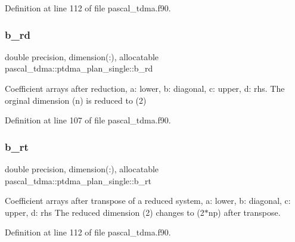 Definition at line 112 of file pascal\+\_\+tdma.\+f90.

\mbox{\label{structpascal__tdma_1_1ptdma__plan__single_acf24e954fa50a47ece2c59598b81c157}} 
\subsubsection{\texorpdfstring{b\_rd}{b\_rd}}
{\footnotesize\ttfamily double precision, dimension(\+:), allocatable pascal\+\_\+tdma\+::ptdma\+\_\+plan\+\_\+single\+::b\+\_\+rd}



Coefficient arrays after reduction, a\+: lower, b\+: diagonal, c\+: upper, d\+: rhs. The orginal dimension (n) is reduced to (2) 



Definition at line 107 of file pascal\+\_\+tdma.\+f90.

\mbox{\label{structpascal__tdma_1_1ptdma__plan__single_a8e9487525ccef0d45c8a5440103613b0}} 
\subsubsection{\texorpdfstring{b\_rt}{b\_rt}}
{\footnotesize\ttfamily double precision, dimension(\+:), allocatable pascal\+\_\+tdma\+::ptdma\+\_\+plan\+\_\+single\+::b\+\_\+rt}



Coefficient arrays after transpose of a reduced system, a\+: lower, b\+: diagonal, c\+: upper, d\+: rhs The reduced dimension (2) changes to (2$\ast$np) after transpose. 



Definition at line 112 of file pascal\+\_\+tdma.\+f90.

\mbox{\label{structpascal__tdma_1_1ptdma__plan__single_a9450979ebd66ed321f27165c8e13629f}} 
